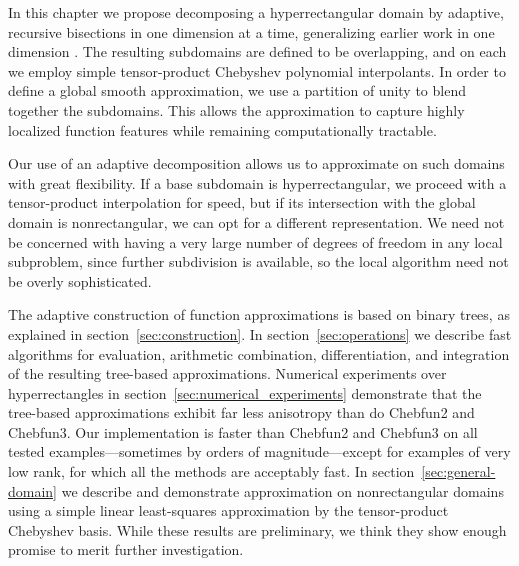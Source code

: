 
In this chapter we propose decomposing a hyperrectangular domain by adaptive, recursive bisections in one dimension at a time, generalizing earlier work in one dimension \cite{Aiton2018}. The resulting subdomains are defined to be overlapping, and on each we employ simple tensor-product Chebyshev polynomial interpolants. In order to define a global smooth approximation, we use a partition of unity to blend together the subdomains. This allows the approximation to capture highly localized function features while remaining computationally tractable.

Our use of an adaptive decomposition allows us to approximate on such domains with great flexibility. If a base subdomain is hyperrectangular, we proceed with a tensor-product interpolation for speed, but if its intersection with the global domain is nonrectangular, we can opt for a different representation. We need not be concerned with having a very large number of degrees of freedom in any local subproblem, since further subdivision is available, so the local algorithm need not be overly sophisticated. 


The adaptive construction of function approximations is based on binary trees, as explained in section~\ref{sec:construction}. In section~\ref{sec:operations} we describe fast algorithms for evaluation, arithmetic combination, differentiation, and integration of the resulting tree-based approximations. Numerical experiments over hyperrectangles in section~\ref{sec:numerical_experiments} demonstrate that the tree-based approximations exhibit far less anisotropy than do Chebfun2 and Chebfun3. Our implementation is faster than Chebfun2 and Chebfun3 on all tested examples---sometimes by orders of magnitude---except for examples of very low rank, for which all the methods are acceptably fast. In section~\ref{sec:general-domain} we describe and demonstrate approximation on nonrectangular domains using a simple linear least-squares approximation by the tensor-product Chebyshev basis. While these results are preliminary, we think they show enough promise to merit further investigation. 




